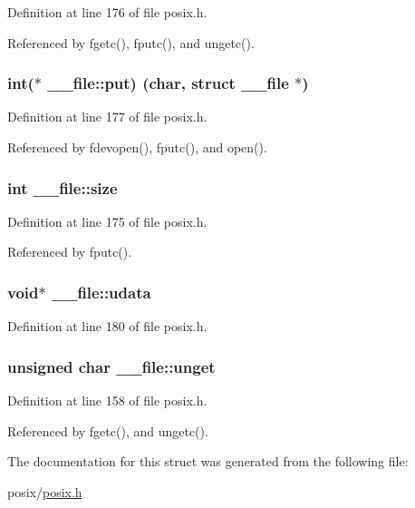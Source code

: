 Definition at line 176 of file posix.\+h.



Referenced by fgetc(), fputc(), and ungetc().

\subsubsection[{\texorpdfstring{put}{put}}]{\setlength{\rightskip}{0pt plus 5cm}int($\ast$ \+\_\+\+\_\+file\+::put) (char, struct {\bf \+\_\+\+\_\+file} $\ast$)}\hypertarget{struct____file_a01c8b217e42cc11b6a7f8429114e9d46}{}\label{struct____file_a01c8b217e42cc11b6a7f8429114e9d46}


Definition at line 177 of file posix.\+h.



Referenced by fdevopen(), fputc(), and open().

\subsubsection[{\texorpdfstring{size}{size}}]{\setlength{\rightskip}{0pt plus 5cm}int \+\_\+\+\_\+file\+::size}\hypertarget{struct____file_aff4a1ca8b6a12460812928afae81248d}{}\label{struct____file_aff4a1ca8b6a12460812928afae81248d}


Definition at line 175 of file posix.\+h.



Referenced by fputc().

\subsubsection[{\texorpdfstring{udata}{udata}}]{\setlength{\rightskip}{0pt plus 5cm}void$\ast$ \+\_\+\+\_\+file\+::udata}\hypertarget{struct____file_abe6f3bdb4df4119277132eb3e13a4628}{}\label{struct____file_abe6f3bdb4df4119277132eb3e13a4628}


Definition at line 180 of file posix.\+h.

\subsubsection[{\texorpdfstring{unget}{unget}}]{\setlength{\rightskip}{0pt plus 5cm}unsigned char \+\_\+\+\_\+file\+::unget}\hypertarget{struct____file_a1d139ae3cb11a1fada469a49f7d3d3b6}{}\label{struct____file_a1d139ae3cb11a1fada469a49f7d3d3b6}


Definition at line 158 of file posix.\+h.



Referenced by fgetc(), and ungetc().



The documentation for this struct was generated from the following file\+:\begin{DoxyCompactItemize}
\item 
posix/\hyperlink{posix_8h}{posix.\+h}\end{DoxyCompactItemize}
